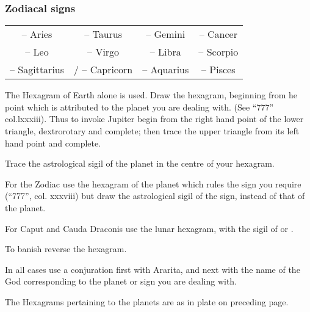 \subsubsection*{Zodiacal signs}
{\centering
\begin{tabular}{c c c c}
\Aries{} -- Aries & \Taurus{} -- Taurus & \Gemini{} -- Gemini & \Cancer{} -- Cancer \\
\Leo{} -- Leo & \Virgo{} -- Virgo & \Libra{} -- Libra & \Scorpio{} -- Scorpio \\
\Sagittarius{} -- Sagittarius & \Capricorn{}/\varCapricorn{} -- Capricorn & \Aquarius{} -- Aquarius & \Pisces{} -- Pisces
\end{tabular}
\par
}


The Hexagram of Earth alone is used. Draw the hexagram, beginning from he point which is attributed to the planet you are dealing with. (See \enquote{777} col.lxxxiii). Thus to invoke Jupiter begin from the right hand point of the lower triangle, dextrorotary and complete; then trace the upper triangle from its left hand point and complete.

Trace the astrological sigil of the planet in the centre of your hexagram.

For the Zodiac use the hexagram of the planet which rules the sign you require (\enquote{777}, col. xxxviii) but draw the astrological sigil of the sign, instead of that of the planet.

For Caput and Cauda Draconis use the lunar hexagram, with the sigil of \rahu{} or \rahur{}.

To banish reverse the hexagram.

In all cases use a conjuration first with Ararita, and next with the name of the God corresponding to the planet or sign you are dealing with.

The Hexagrams pertaining to the planets are as in plate on preceding page.

